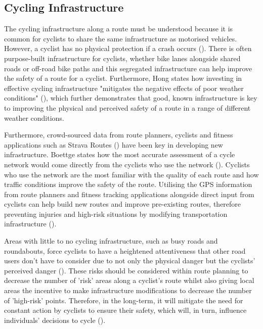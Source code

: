 \subsection{Cycling Infrastructure}
\label{litrev:cyclinginfrastructure}
The cycling infrastructure along a route must be understood because it is common for cyclists to share the same infrastructure as motorised vehicles. However, a cyclist has no physical protection if a crash occurs (\cite{reynolds_impact_2009}). There is often purpose-built infrastructure for cyclists, whether bike lanes alongside shared roads or off-road bike paths and this segregated infrastructure can help improve the safety of a route for a cyclist. Furthermore, Hong states how investing in effective cycling infrastructure "mitigates the negative effects of poor weather conditions" (\cite{hong_can_2020}), which further demonstrates that good, known infrastructure is key to improving the physical and perceived safety of a route in a range of different weather conditions. 

Furthermore, crowd-sourced data from route planners, cyclists and fitness applications such as Strava Routes (\cite{noauthor_strava_nodate}) have been key in developing new infrastructure. Boettge states how the most accurate assessment of a cycle network would come directly from the cyclists who use the network (\cite{boettge_assessing_2017}). Cyclists who use the network are the most familiar with the quality of each route and how traffic conditions improve the safety of the route. Utilising the GPS information from route planners and fitness tracking applications alongside direct input from cyclists can help build new routes and improve pre-existing routes, therefore preventing injuries and high-risk situations by modifying transportation infrastructure (\cite{reynolds_impact_2009}).

Areas with little to no cycling infrastructure, such as busy roads and roundabouts, force cyclists to have a heightened attentiveness that other road users don't have to consider due to not only the physical danger but the cyclists' perceived danger (\cite{doorley_analysis_2015}). These risks should be considered within route planning to decrease the number of 'risk' areas along a cyclist's route whilst also giving local areas the incentive to make infrastructure modifications to decrease the number of 'high-risk' points. Therefore, in the long-term, it will mitigate the need for constant action by cyclists to ensure their safety, which will, in turn, influence individuals' decisions to cycle (\cite{reynolds_impact_2009}).

